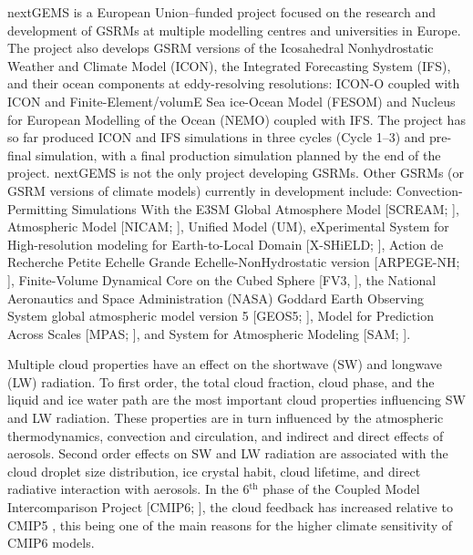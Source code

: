 \documentclass[12pt,a4paper]{article}
\begin{document}
nextGEMS is a European Union--funded project \citep{nextgems} focused on the research and
development of GSRMs at multiple modelling centres and universities in Europe.
The project also develops GSRM versions of the Icosahedral Nonhydrostatic
Weather and Climate Model (ICON), the Integrated Forecasting System (IFS), and
their ocean components at eddy-resolving resolutions: ICON-O coupled with ICON
and Finite-Element/volumE Sea ice-Ocean Model (FESOM) and Nucleus for European
Modelling of the Ocean (NEMO) coupled with IFS.  The project has so far
produced ICON and IFS simulations in three cycles (Cycle 1--3) and pre-final
simulation, with a final production simulation planned by the end of the
project. nextGEMS is not the only project developing GSRMs. Other GSRMs (or
GSRM versions of climate models) currently in development include:
Convection-Permitting Simulations With the E3SM Global Atmosphere Model
[SCREAM; \cite{caldwell2021}], Atmospheric Model [NICAM; \cite{satoh2008}],
Unified Model (UM), eXperimental System for High-resolution modeling for
Earth-to-Local Domain [X-SHiELD; \cite{shield}], Action de Recherche Petite
Echelle Grande Echelle-NonHydrostatic version [ARPEGE-NH;
\cite{bubnova1995,voldoire2017}], Finite-Volume Dynamical Core on the Cubed
Sphere [FV3, \cite{lin2004}], the National Aeronautics and Space Administration
(NASA) Goddard Earth Observing System global atmospheric model version 5
[GEOS5; \cite{putman2011}], Model for Prediction Across Scales [MPAS;
\cite{skamarock2012}], and System for Atmospheric Modeling [SAM;
\cite{khairoutdinov2003}].

Multiple cloud properties have an effect on the shortwave (SW) and longwave
(LW) radiation. To first order, the total cloud fraction, cloud
phase, and the liquid and ice water path are the most important cloud properties influencing SW and LW radiation. These properties are  in turn influenced by the
atmospheric thermodynamics, convection and circulation, and indirect and direct
effects of aerosols. Second order effects on SW and LW radiation are associated with the cloud droplet size
distribution, ice crystal habit, cloud lifetime, and direct radiative
interaction with aerosols.  In the 6$^\mathrm{th}$ phase of the Coupled Model
Intercomparison Project [CMIP6; \cite{eyring2016}], the cloud feedback has
increased relative to CMIP5 \citep{zelinka2020}, this being one of the main
reasons for the higher climate sensitivity of CMIP6 models.
\end{document}
